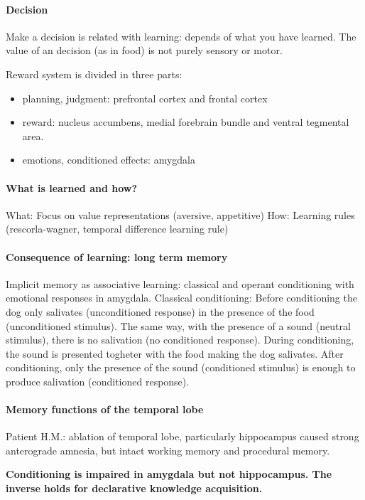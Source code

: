 \documentclass[12pt,article,oneside,a4paper]{memoir}
\begin{document}
\paragraph{Decision}
Make a decision is related with learning: depends of what you have learned.
The value of an decision (as in food) is not purely sensory or motor.

Reward system is divided in three parts:
\begin{itemize}
\item planning, judgment: prefrontal cortex and frontal cortex
\item reward: nucleus accumbens, medial forebrain bundle and ventral tegmental
area.
\item emotions, conditioned effects: amygdala
\end{itemize}

\paragraph{What is learned and how?}
What: Focus on value representations (aversive, appetitive)
How: Learning rules (rescorla-wagner, temporal difference learning rule)

\paragraph{Consequence of learning: long term memory}
Implicit memory as associative learning: classical and operant conditioning with
emotional responses in amygdala.
Classical conditioning: Before conditioning the dog only salivates
(unconditioned response) in the presence of the food (unconditioned stimulus).
The same way, with the presence of a sound (neutral stimulus), there is no
salivation (no conditioned response). During conditioning, the sound is presented
togheter with the food making the dog salivates. After conditioning, only the
presence of the sound (conditioned stimulus) is enough to produce salivation
(conditioned response).

\paragraph{Memory functions of the temporal lobe}
Patient H.M.: ablation of temporal lobe, particularly hippocampus caused strong
anterograde amnesia, but intact working memory and procedural memory.

\textbf{Conditioning is impaired in amygdala but not hippocampus. The inverse
holds for declarative knowledge acquisition.}
\end{document}
